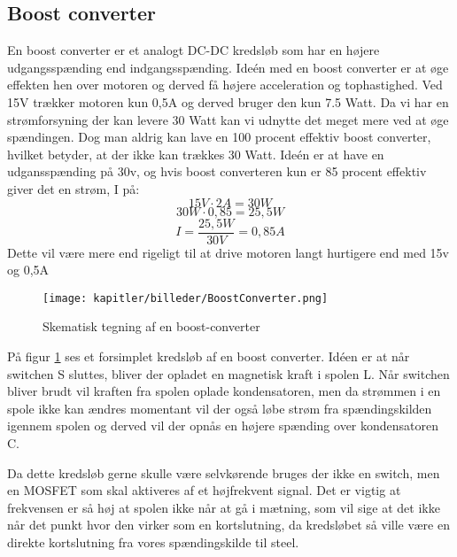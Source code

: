 \newpage
\subsection{Boost converter}
En boost converter er et analogt DC-DC kredsløb som har en højere udgangsspænding end indgangsspænding.
Ideén med en boost converter er at øge effekten hen over motoren og derved få højere acceleration og tophastighed. Ved 15V trækker motoren kun 0,5A og derved bruger den kun 7.5 Watt. Da vi har en strømforsyning der kan levere 30 Watt kan vi udnytte det meget mere ved at øge spændingen. Dog man aldrig kan lave en 100 procent effektiv boost converter, hvilket betyder, at der ikke kan trækkes 30 Watt.  Ideén er at have en udgansspænding på 30v, og hvis boost converteren kun er 85 procent effektiv giver det en strøm, I på:
\begin{equation}
15V \cdot 2A = 30 W
\end{equation}
\begin{equation}
30 W \cdot 0,85 = 25,5 W
\end{equation}
\begin{equation}
I = \frac{25,5 W}{30 V} = 0,85A
\end{equation}
Dette vil være mere end rigeligt til at drive motoren langt hurtigere end med 15v og 0,5A

\begin{figure}[ht]
    \centering
    \texttt{[image: kapitler/billeder/BoostConverter.png]}
    \caption{Skematisk tegning af en boost-converter}
    \label{fig:boostconvert}
\end{figure}

På figur \ref{fig:boostconvert} ses et forsimplet kredsløb af en boost converter. Idéen er at når switchen S sluttes, bliver der opladet en magnetisk kraft i spolen L. Når switchen bliver brudt vil kraften fra spolen oplade kondensatoren, men da strømmen i en spole ikke kan ændres momentant vil der også løbe strøm fra spændingskilden igennem spolen og derved vil der opnås en højere spænding over kondensatoren C.

Da dette kredsløb gerne skulle være selvkørende bruges der ikke en switch, men en MOSFET som skal aktiveres af et højfrekvent signal. Det er vigtig at frekvensen er så høj at spolen ikke når at gå i mætning, som vil sige at det ikke når det punkt hvor den virker som en kortslutning, da kredsløbet så ville være en direkte kortslutning fra vores spændingskilde til steel.

